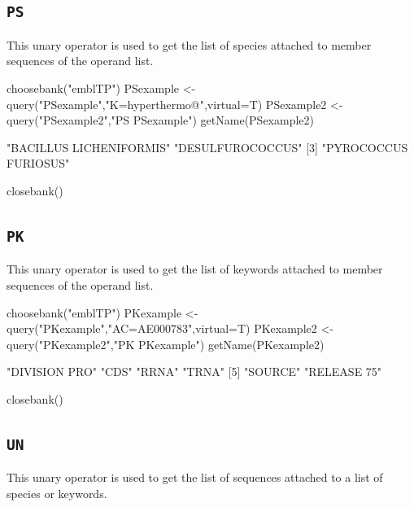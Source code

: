 \documentclass{article}
\begin{document}
\subsection{\texttt{PS}}

This unary operator is used to get the list of species attached to member 
sequences of the operand list.

\begin{Schunk}
\begin{Sinput}
 choosebank("emblTP")
 PSexample <- query("PSexample","K=hyperthermo@",virtual=T)
 PSexample2 <- query("PSexample2","PS PSexample")
 getName(PSexample2)
\end{Sinput}
\begin{Soutput}
[1] "BACILLUS LICHENIFORMIS" "DESULFUROCOCCUS"       
[3] "PYROCOCCUS FURIOSUS"   
\end{Soutput}
\begin{Sinput}
 closebank()
\end{Sinput}
\end{Schunk}

\subsection{\texttt{PK}}

This unary operator is used to get the list of keywords attached to member sequences 
of the operand list.

\begin{Schunk}
\begin{Sinput}
 choosebank("emblTP")
 PKexample <- query("PKexample","AC=AE000783",virtual=T)
 PKexample2 <- query("PKexample2","PK PKexample")
 getName(PKexample2)
\end{Sinput}
\begin{Soutput}
[1] "DIVISION PRO" "CDS"          "RRNA"         "TRNA"        
[5] "SOURCE"       "RELEASE 75"  
\end{Soutput}
\begin{Sinput}
 closebank()
\end{Sinput}
\end{Schunk}

\subsection{\texttt{UN}}

This unary operator is used to get the list of sequences attached to a list
of species or keywords.
\end{document}
